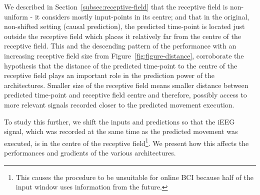We described in Section~\ref{subsec:receptive-field} that the receptive field is non-uniform - it considers mostly input-points in its centre; and that in the original, non-shifted setting (causal prediction), the predicted time-point is located just outside the receptive field which places it relatively far from the centre of the receptive field. 
This and the descending pattern of the performance with an increasing receptive field size from Figure~\ref{fig:figure-distance}, corroborate the hypothesis that the distance of the predicted time-point to the centre of the receptive field plays an important role in the prediction power of the architectures.
Smaller size of the receptive field means smaller distance between predicted time-point and receptive field centre and therefore, possibly access to more relevant signals recorded closer to the predicted movement execution.

To study this further, we shift the inputs and predictions so that the iEEG signal, which was recorded at the same time as the predicted movement was executed, is in the centre of the receptive field\footnote{This causes the procedure to be unsuitable for online BCI because half of the input window uses information from the future.}. 
We present how this affects the performances and gradients of the various architectures.

